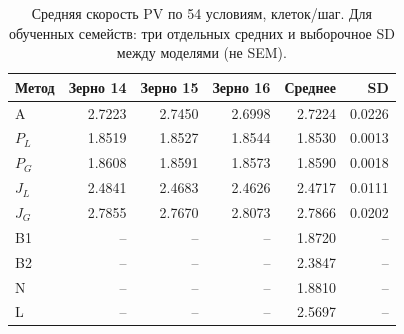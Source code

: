 \begin{table}[htbp]
\centering
\caption{Средняя скорость PV по 54 условиям, клеток/шаг. Для обученных семейств: три отдельных средних и выборочное SD между моделями (не SEM).}
\label{tab:main-overview}
\small
\begin{tabular}{lrrrrr}
\hline
Метод & Зерно 14 & Зерно 15 & Зерно 16 & Среднее & SD \\
\hline
A & 2.7223 & 2.7450 & 2.6998 & 2.7224 & 0.0226 \\
$P_{L}$ & 1.8519 & 1.8527 & 1.8544 & 1.8530 & 0.0013 \\
$P_{G}$ & 1.8608 & 1.8591 & 1.8573 & 1.8590 & 0.0018 \\
$J_{L}$ & 2.4841 & 2.4683 & 2.4626 & 2.4717 & 0.0111 \\
$J_{G}$ & 2.7855 & 2.7670 & 2.8073 & 2.7866 & 0.0202 \\
B1 & -- & -- & -- & 1.8720 & -- \\
B2 & -- & -- & -- & 2.3847 & -- \\
N & -- & -- & -- & 1.8810 & -- \\
L & -- & -- & -- & 2.5697 & -- \\
\hline
\end{tabular}
\end{table}
